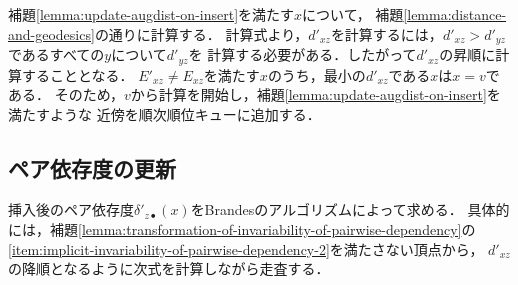 補題\ref{lemma:update-augdist-on-insert}を満たす$x$について，
補題\ref{lemma:distance-and-geodesics}の通りに計算する．
計算式より，$d'_{xz}$を計算するには，$d'_{xz}>d'_{yz}$であるすべての$y$について$d'_{yz}$を
計算する必要がある．したがって$d'_{xz}$の昇順に計算することとなる．
$E'_{xz}\neq E_{xz}$を満たす$x$のうち，最小の$d'_{xz}$である$x$は$x=v$である．
そのため，$v$から計算を開始し，補題\ref{lemma:update-augdist-on-insert}を満たすような
近傍を順次順位キューに追加する．

\subsection{ペア依存度の更新}
\label{subsect:update-delta-on-insert}

挿入後のペア依存度$\delta'_{z\bullet}(x)$をBrandesのアルゴリズムによって求める．
具体的には，補題\ref{lemma:transformation-of-invariability-of-pairwise-dependency}の
\ref{item:implicit-invariability-of-pairwise-dependency-2}を満たさない頂点から，
$d'_{xz}$の降順となるように次式を計算しながら走査する．

